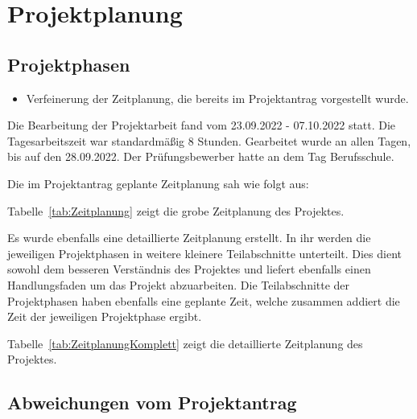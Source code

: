 \section{Projektplanung} 
\label{sec:Projektplanung}


\subsection{Projektphasen}
\label{sec:Projektphasen}

\begin{itemize}
	\item Verfeinerung der Zeitplanung, die bereits im Projektantrag vorgestellt wurde.
\end{itemize}

Die Bearbeitung der Projektarbeit fand vom 23.09.2022 - 07.10.2022 statt. Die Tagesarbeitszeit war standardmäßig 8 Stunden. Gearbeitet wurde an allen Tagen, bis auf den 28.09.2022. Der Prüfungsbewerber hatte an dem Tag Berufsschule. 

Die im Projektantrag geplante Zeitplanung sah wie folgt aus:

\newpage

Tabelle~\ref{tab:Zeitplanung} zeigt die grobe Zeitplanung des Projektes.

Es wurde ebenfalls eine detaillierte Zeitplanung erstellt. In ihr werden die jeweiligen Projektphasen in weitere kleinere Teilabschnitte unterteilt. Dies dient sowohl dem besseren Verständnis des Projektes und liefert ebenfalls einen Handlungsfaden um das Projekt abzuarbeiten. Die Teilabschnitte der Projektphasen haben ebenfalls eine geplante Zeit, welche zusammen addiert die Zeit der jeweiligen Projektphase ergibt.

\newpage

Tabelle~\ref{tab:ZeitplanungKomplett} zeigt die detaillierte Zeitplanung des Projektes.

\newpage

\subsection{Abweichungen vom Projektantrag}
\label{sec:AbweichungenProjektantrag}


